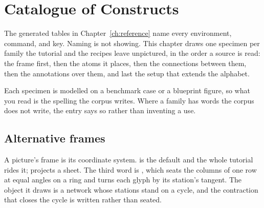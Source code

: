 \section{Catalogue of Constructs}\label{ch:catalogue}

The generated tables in Chapter~\ref{ch:reference} name every environment,
command, and key.  Naming is not showing.  This chapter draws one specimen
per family the tutorial and the recipes leave unpictured, in the order a
source is read: the frame first, then the atoms it places, then the
connections between them, then the annotations over them, and last the
setup that extends the alphabet.

Each specimen is modelled on a benchmark case or a blueprint figure, so
what you read is the spelling the corpus writes.  Where a family has words
the corpus does not write, the entry says so rather than inventing a use.

\subsection{Alternative frames}

A picture's frame is its coordinate system.   is
the default and the whole tutorial rides it;  projects a
sheet.  The third word is , which seats the columns of one
row at equal angles on a ring and turns each glyph by its station's
tangent.  The object it draws is a network whose stations stand on a
cycle, and the contraction that closes the cycle is written rather than
seated.

